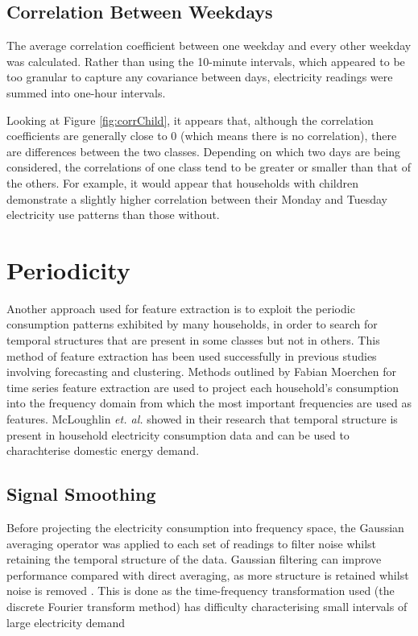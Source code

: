 \logADVChild
\logADVSocio

\subsection*{Correlation Between Weekdays}

The average correlation coefficient between one weekday and every other weekday was calculated. Rather than using the 10-minute intervals, which appeared to be too granular to capture any covariance between days, electricity readings were summed into one-hour intervals.


\corrChild

Looking at Figure \ref{fig:corrChild}, it appears that, although the correlation coefficients are generally close to 0 (which means there is no correlation), there are differences between the two classes. Depending on which two days are being considered, the correlations of one class tend to be greater or smaller than that of the others. For example, it would appear that households with children demonstrate a slightly higher correlation between their Monday and Tuesday electricity use patterns than those without.

\corrSocio 


\section{Periodicity}

Another approach used for feature extraction is to exploit the periodic consumption patterns exhibited by many households, in order to search for temporal structures that are present in some classes but not in others. This method of feature extraction has been used successfully in previous studies involving forecasting and clustering. Methods outlined by Fabian Moerchen \cite{Moerchen} for time series feature extraction are used to project each household's consumption into the frequency domain from which the most important frequencies are used as features. McLoughlin \textit{et. al.} \cite{McLoughlin} showed in their research that temporal structure is present in household electricity consumption data and can be used to charachterise domestic energy demand.


\subsection*{Signal Smoothing}

Before projecting the electricity consumption into frequency space, the Gaussian averaging operator was applied to each set of readings to filter noise whilst retaining the temporal structure of the data. Gaussian filtering can improve performance compared with direct averaging, as more structure is retained whilst noise is removed \cite{Nixon}. This is done as the time-frequency transformation used (the discrete Fourier transform method) has difficulty characterising small intervals of large electricity demand \cite{Graps}

